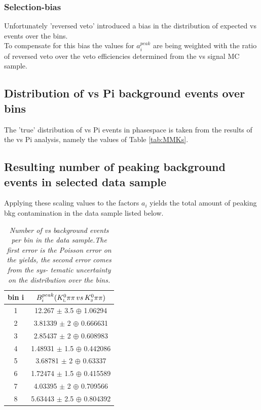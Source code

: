 \subsubsection{Selection-bias}	
Unfortunately 'reversed \KS veto' introduced a bias in the distribution of expected \KlPiPi vs \KsPiPi events over the bins. \\
To compensate for this bias the values for $a_i^{peak}$ are being weighted with the ratio of reversed \KS veto over the \KS veto efficiencies determined from the \KlPiPi vs \KsPiPi signal MC sample.\\

\subsection{Distribution of \KsPiPi vs \4Pi background events over bins}
The 'true' distribution of \KsPiPi vs \4Pi events in phasespace is taken from the results of the \KsPiPi vs \4Pi analysis, namely the values of Table \ref{tab:MMKs}.\\


\subsection{Resulting number of peaking background events in selected data sample}
Applying these scaling values to the factors $a_i$ yields the total amount of peaking bkg contamination in the data sample listed below.

\begin{table}[!h]
	\begin{center}
		\begin{tabular}{c| c}
			bin i & $B^{peak}_i({K^0_{\rm\scriptscriptstyle L}}{\pi}\pi\, vs\, {K^0_{\rm\scriptscriptstyle S}}{\pi}\pi)$    \\
			\hline 
			\hline
1 & 12.267 $\pm$ 3.5 $\oplus$ 1.06294 \\ 
2 & 3.81339 $\pm$ 2 $\oplus$ 0.666631 \\ 
3 & 2.85437 $\pm$ 2 $\oplus$ 0.608983 \\ 
4 & 1.48931 $\pm$ 1.5 $\oplus$ 0.442086 \\ 
5 & 3.68781 $\pm$ 2 $\oplus$ 0.63337 \\ 
6 & 1.72474 $\pm$ 1.5 $\oplus$ 0.415589 \\ 
7 & 4.03395 $\pm$ 2 $\oplus$ 0.709566 \\ 
8 & 5.63443 $\pm$ 2.5 $\oplus$ 0.804392 \\ 
	\end{tabular}
	\end{center}
	\caption{\textit{Number of \KsPiPi vs \KlPiPi background events per bin in the data sample.The first error is the Poisson error on the yields, the second error comes from the sys- tematic uncertainty on the distribution over the bins. }}
	\vspace*{1cm}
\end{table}

